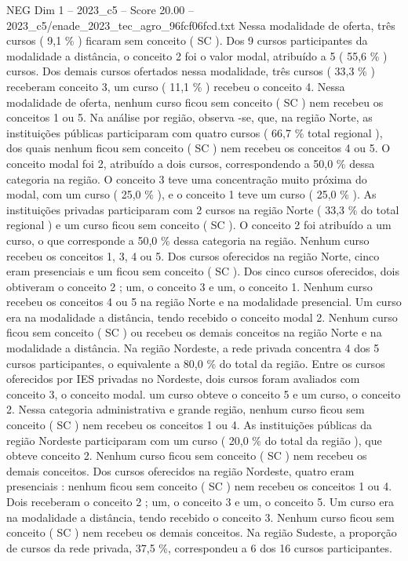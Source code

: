 \begin{textsample}{NEG Dim 1 – 2023\_c5 – Score 20.00 – 2023\_c5/enade\_2023\_tec\_agro\_96fcf06fcd.txt}
Nessa modalidade de oferta, três cursos ( 9,1 \% ) ficaram sem conceito ( SC ).
Dos 9 cursos participantes da modalidade a distância, o conceito 2 foi o valor modal, atribuído a 5 ( 55,6 \% ) cursos.
Dos demais cursos ofertados nessa modalidade, três cursos ( 33,3 \% ) receberam conceito 3, um curso ( 11,1 \% ) recebeu o conceito 4.
Nessa modalidade de oferta, nenhum curso ficou sem conceito ( SC ) nem recebeu os conceitos 1 ou 5.
Na análise por região, observa -se, que, na região Norte, as instituições públicas participaram com quatro cursos ( 66,7 \% total regional ), dos quais nenhum ficou sem conceito ( SC ) nem recebeu os conceitos 4 ou 5.
O conceito modal foi 2, atribuído a dois cursos, correspondendo a 50,0 \% dessa categoria na região.
O conceito 3 teve uma concentração muito próxima do modal, com um curso ( 25,0 \% ), e o conceito 1 teve um curso ( 25,0 \% ).
As instituições privadas participaram com 2 cursos na região Norte ( 33,3 \% do total regional ) e um curso ficou sem conceito ( SC ).
O conceito 2 foi atribuído a um curso, o que corresponde a 50,0 \% dessa categoria na região.
Nenhum curso recebeu os conceitos 1, 3, 4 ou 5.
Dos cursos oferecidos na região Norte, cinco eram presenciais e um ficou sem conceito ( SC ).
Dos cinco cursos oferecidos, dois obtiveram o conceito 2 ; um, o conceito 3 e um, o conceito 1.
Nenhum curso recebeu os conceitos 4 ou 5 na região Norte e na modalidade presencial.
Um curso era na modalidade a distância, tendo recebido o conceito modal 2.
Nenhum curso ficou sem conceito ( SC ) ou recebeu os demais conceitos na região Norte e na modalidade a distância.
Na região Nordeste, a rede privada concentra 4 dos 5 cursos participantes, o equivalente a 80,0 \% do total da região.
Entre os cursos oferecidos por IES privadas no Nordeste, dois cursos foram avaliados com conceito 3, o conceito modal. um curso obteve o conceito 5 e um curso, o conceito 2.
Nessa categoria administrativa e grande região, nenhum curso ficou sem conceito ( SC ) nem recebeu os conceitos 1 ou 4.
As instituições públicas da região Nordeste participaram com um curso ( 20,0 \% do total da região ), que obteve conceito 2.
Nenhum curso ficou sem conceito ( SC ) nem recebeu os demais conceitos.
Dos cursos oferecidos na região Nordeste, quatro eram presenciais : nenhum ficou sem conceito ( SC ) nem recebeu os conceitos 1 ou 4.
Dois receberam o conceito 2 ; um, o conceito 3 e um, o conceito 5.
Um curso era na modalidade a distância, tendo recebido o conceito 3.
Nenhum curso ficou sem conceito ( SC ) nem recebeu os demais conceitos.
Na região Sudeste, a proporção de cursos da rede privada, 37,5 \%, correspondeu a 6 dos 16 cursos participantes.

\end{textsample}
